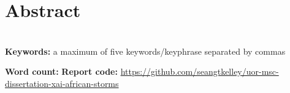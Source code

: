 \chapter*{\center \Large  Abstract}




~\\[1cm]
\noindent %
\textbf{Keywords:} a maximum of five keywords/keyphrase separated by commas

\vfill
\noindent
\textbf{Word count:}  \newline
\newline
\noindent
\textbf{Report code:} \href{https://github.com/seangtkelley/uor-msc-dissertation-xai-african-storms}{https://github.com/seangtkelley/uor-msc-dissertation-xai-african-storms}  \newline

